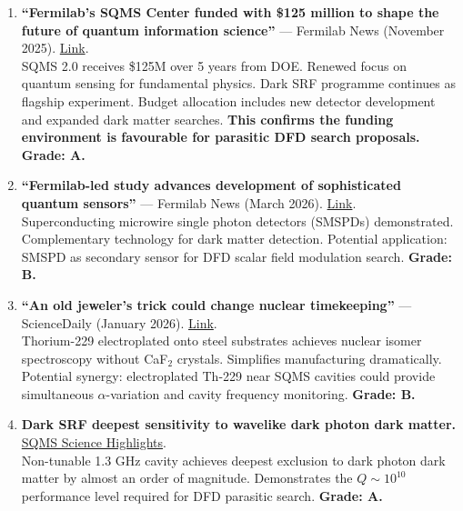 \documentclass[11pt,a4paper]{article}
\begin{document}
\begin{enumerate}
\item \textbf{``Fermilab's SQMS Center funded with \$125 million to shape the future of quantum information science''} --- Fermilab News (November 2025). \href{https://news.fnal.gov/2025/11/fermilabs-sqms-center-funded-with-125-million-to-shape-the-future-of-quantum-information-science/}{Link}.\\
SQMS 2.0 receives \$125M over 5 years from DOE. Renewed focus on quantum sensing for fundamental physics. Dark SRF programme continues as flagship experiment. Budget allocation includes new detector development and expanded dark matter searches. \textbf{This confirms the funding environment is favourable for parasitic DFD search proposals.} \textbf{Grade: A.}

\item \textbf{``Fermilab-led study advances development of sophisticated quantum sensors''} --- Fermilab News (March 2026). \href{https://news.fnal.gov/2026/03/fermilab-led-study-advances-development-of-sophisticated-quantum-sensors-to-track-high-energy-particles-and-detect-dark-matter/}{Link}.\\
Superconducting microwire single photon detectors (SMSPDs) demonstrated. Complementary technology for dark matter detection. Potential application: SMSPD as secondary sensor for DFD scalar field modulation search. \textbf{Grade: B.}

\item \textbf{``An old jeweler's trick could change nuclear timekeeping''} --- ScienceDaily (January 2026). \href{https://www.sciencedaily.com/releases/2026/01/260107225542.htm}{Link}.\\
Thorium-229 electroplated onto steel substrates achieves nuclear isomer spectroscopy without CaF$_2$ crystals. Simplifies manufacturing dramatically. Potential synergy: electroplated Th-229 near SQMS cavities could provide simultaneous $\alpha$-variation and cavity frequency monitoring. \textbf{Grade: B.}

\item \textbf{Dark SRF deepest sensitivity to wavelike dark photon dark matter.} \href{https://sqmscenter.fnal.gov/deepest-sensitivity-to-wavelike-dark-photon-dark-matter-with-srf-cavities/}{SQMS Science Highlights}.\\
Non-tunable 1.3 GHz cavity achieves deepest exclusion to dark photon dark matter by almost an order of magnitude. Demonstrates the $Q \sim 10^{10}$ performance level required for DFD parasitic search. \textbf{Grade: A.}
\end{enumerate}
\end{document}
